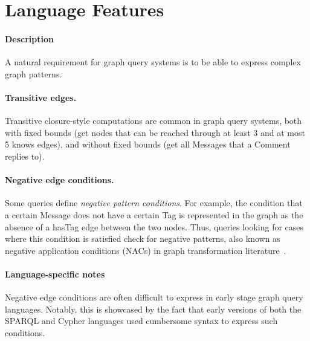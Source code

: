 
\section{Language Features}




\paragraph{Description}

A natural requirement for graph query systems is to be able to express complex
graph patterns.

\paragraph{Transitive edges.} Transitive closure-style computations are common in graph query systems, both with fixed bounds
(\eg get nodes that can be reached through at least 3 and at most 5 \textsf{knows} edges),
and without fixed bounds
(\eg get all \textsf{Messages} that a \textsf{Comment} replies to).

\paragraph{Negative edge conditions.} Some queries define \emph{negative pattern conditions}. For example, the condition that a certain \textsf{Message} does not have a certain \textsf{Tag} is represented in the graph as the absence of a \textsf{hasTag} edge between the two nodes. Thus, queries looking for cases where this condition is satisfied check for negative patterns, also known as negative application conditions (NACs) in graph transformation literature~\cite{DBLP:journals/fuin/HabelHT96}.

\paragraph{Language-specific notes}

Negative edge conditions are often difficult to express in early stage graph query languages. Notably, this is showcased by the fact that early versions of both the SPARQL and Cypher languages used cumbersome syntax to express such conditions.

